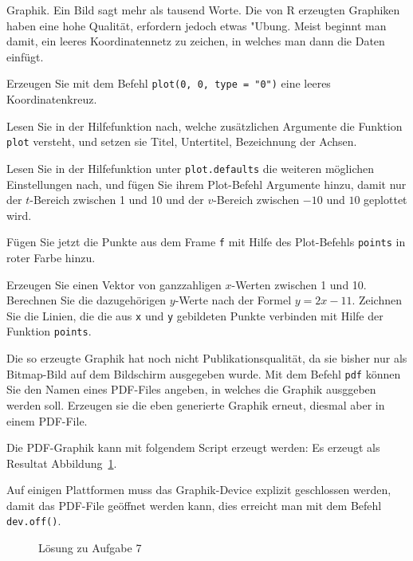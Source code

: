 Graphik. Ein Bild sagt mehr als tausend Worte. Die von R erzeugten
Graphiken haben eine hohe Qualität, erfordern jedoch etwas "Ubung.
Meist beginnt man damit, ein leeres Koordinatennetz zu zeichen, in welches
man dann die Daten einfügt.
\begin{teilaufgaben}
\item Erzeugen Sie mit dem Befehl \verb+plot(0, 0, type = "0")+ eine
leeres Koordinatenkreuz.
\item Lesen Sie in der Hilfefunktion nach, welche zusätzlichen
Argumente die Funktion {\tt plot} versteht, und setzen sie Titel,
Untertitel, Bezeichnung der Achsen.
\item Lesen Sie in der Hilfefunktion unter {\tt plot.defaults} die
weiteren möglichen Einstellungen nach, und fügen Sie ihrem Plot-Befehl
Argumente hinzu, damit nur der $t$-Bereich zwischen 1 und 10 und der
$v$-Bereich zwischen $-10$ und $10$ geplottet wird.
\item Fügen Sie jetzt die Punkte aus dem Frame {\tt f} mit Hilfe des
Plot-Befehls {\tt points} in roter Farbe hinzu.
\item Erzeugen Sie einen Vektor von ganzzahligen $x$-Werten zwischen 1
und 10. Berechnen Sie die dazugehörigen $y$-Werte nach der Formel $y=2x-11$.
Zeichnen Sie die Linien, die die aus {\tt x} und {\tt y} gebildeten
Punkte verbinden mit Hilfe der Funktion {\tt points}.
\item Die so erzeugte Graphik hat noch nicht Publikationsqualität, da
sie bisher nur als Bitmap-Bild auf dem Bildschirm ausgegeben wurde.
Mit dem Befehl {\tt pdf} können Sie den Namen eines PDF-Files angeben,
in welches die Graphik ausggeben werden soll. Erzeugen sie die eben
generierte Graphik erneut, diesmal aber in einem PDF-File.
\end{teilaufgaben}

\begin{loesung}
Die PDF-Graphik kann mit folgendem Script erzeugt werden:
Es erzeugt als Resultat Abbildung~\ref{r0000007:aufg7}.

Auf einigen Plattformen muss das Graphik-Device explizit geschlossen
werden, damit das PDF-File geöffnet werden kann, dies erreicht man
mit dem Befehl {\tt dev.off()}.
\begin{figure}
\begin{center}
\end{center}
\caption{Lösung zu Aufgabe 7\label{r0000007:aufg7}}
\end{figure}
\end{loesung}

